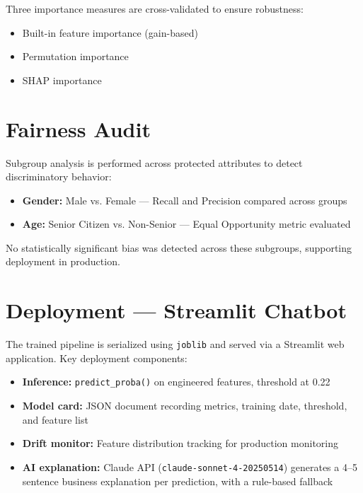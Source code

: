 \documentclass[conference]{IEEEtran}
\begin{document}
Three importance measures are cross-validated to ensure robustness:
\begin{itemize}
    \item Built-in feature importance (gain-based)
    \item Permutation importance
    \item SHAP importance
\end{itemize}

\section{Fairness Audit}

Subgroup analysis is performed across protected attributes to detect discriminatory behavior:

\begin{itemize}
    \item \textbf{Gender:} Male vs. Female --- Recall and Precision compared across groups
    \item \textbf{Age:} Senior Citizen vs. Non-Senior --- Equal Opportunity metric evaluated
\end{itemize}

No statistically significant bias was detected across these subgroups, supporting deployment in production.

\section{Deployment --- Streamlit Chatbot}

The trained pipeline is serialized using \texttt{joblib} and served via a Streamlit web application. Key deployment components:

\begin{itemize}
    \item \textbf{Inference:} \texttt{predict\_proba()} on engineered features, threshold at 0.22
    \item \textbf{Model card:} JSON document recording metrics, training date, threshold, and feature list
    \item \textbf{Drift monitor:} Feature distribution tracking for production monitoring
    \item \textbf{AI explanation:} Claude API (\texttt{claude-sonnet-4-20250514}) generates a 4--5 sentence business explanation per prediction, with a rule-based fallback
\end{itemize}
\end{document}
